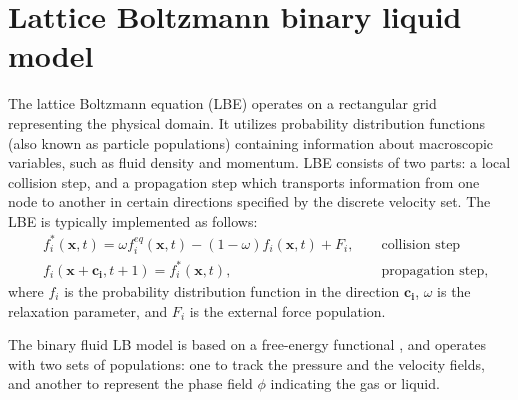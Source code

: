 \documentclass[preprint,12pt]{elsarticle}
\begin{document}
\section{Lattice Boltzmann binary liquid model}
The lattice Boltzmann equation (LBE) operates on a rectangular grid representing the
physical domain. It utilizes
probability distribution functions (also known as particle populations)
containing information about
macroscopic variables, such as fluid density and momentum. LBE consists of
two parts: a local collision step, and a propagation step which transports
information from one node to another in certain
directions specified by the discrete velocity set.
The LBE is typically implemented as follows:
\begin{equation}
\label{standard:implementation}
\begin{aligned}
&f_i^{*}(\bm{x},t)=\omega f_i^{eq}(\bm{x},t)-(1-\omega) f_i(\bm{x},t) +
F_i,&&\text{ collision step}\\
&f_i(\bm{x}+\bm{c_i},t+1)=f_i^{*}(\bm{x},t),&&\text{ propagation step}, 
\end{aligned}
\end{equation}
where $f_i$ is the probability distribution function in the direction $\bm{c_i}$, $\omega$ is the
relaxation parameter, and $F_i$ is the external force population. 

The binary fluid LB model is
based on a free-energy functional \cite{swift,landau}, and operates with two
sets of populations: one to track the pressure and the velocity fields, and another to represent the
phase field $\phi$ indicating the gas or liquid.
\end{document}
